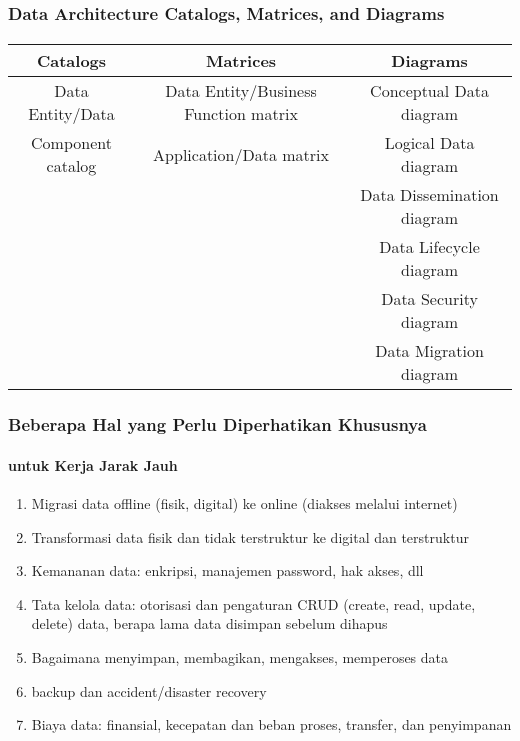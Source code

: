 \documentclass[aspectratio=169, table]{beamer}
\begin{document}
	\begin{frame}
		\frametitle{ Data Architecture Catalogs, Matrices, and Diagrams}
		\framesubtitle{\hspace{1cm}}
        \begin{small}
		\begin{table}[]
			\begin{tabular}{|c|c|c|}
				\hline
				\textbf{Catalogs} & \textbf{Matrices}   & \textbf{Diagrams} \\ \hline
				Data Entity/Data                   & Data Entity/Business Function matrix & Conceptual Data diagram            \\
				Component catalog                  & Application/Data matrix              & Logical Data diagram               \\
				&                                      & Data Dissemination diagram         \\
				&                                      & Data Lifecycle diagram             \\
				&                                      & Data Security diagram              \\
				&                                      & Data Migration diagram             \\ \hline
			\end{tabular}
		\end{table}
        \end{small}
	\end{frame}


	\begin{frame}
		\frametitle{Beberapa Hal yang Perlu Diperhatikan Khususnya }
		\framesubtitle{untuk Kerja Jarak Jauh}
		\begin{enumerate}
			\item Migrasi data offline (fisik, digital) ke online (diakses melalui internet)
			\item Transformasi data fisik dan tidak terstruktur ke digital dan terstruktur
			\item Kemananan data: enkripsi, manajemen password, hak akses, dll
			\item Tata kelola data: otorisasi dan pengaturan CRUD (create, read, update, delete) data, berapa lama data disimpan sebelum dihapus
			\item Bagaimana menyimpan, membagikan, mengakses, memperoses data
			\item backup dan accident/disaster recovery
			\item Biaya data: finansial, kecepatan dan beban proses, transfer, dan penyimpanan
		\end{enumerate}
	\end{frame}
\end{document}
